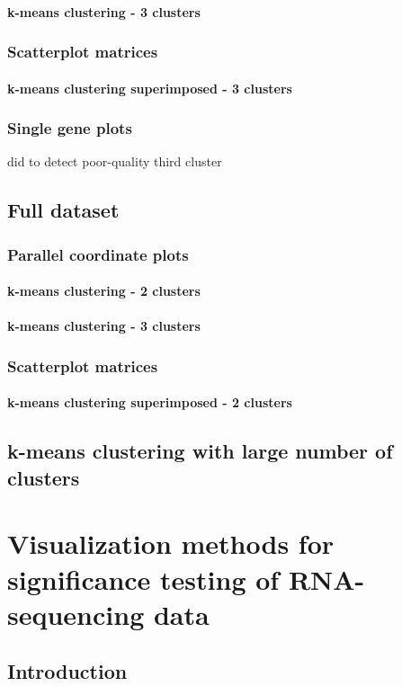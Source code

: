 \documentclass[11pt,a4paper,oldfontcommands,openany]{memoir}
\numberwithin{equation}{section} %
\begin{document}
\subsubsection{k-means clustering - 3 clusters}
\subsection{Scatterplot matrices}
\subsubsection{k-means clustering superimposed - 3 clusters}
\subsection{Single gene plots}
did to detect poor-quality third cluster
\section{Full dataset}
\subsection{Parallel coordinate plots}
\subsubsection{k-means clustering - 2 clusters}
\subsubsection{k-means clustering - 3 clusters}
\subsection{Scatterplot matrices}
\subsubsection{k-means clustering superimposed - 2 clusters}
\section{k-means clustering with large number of clusters}

\chapter{Visualization methods for significance testing of RNA-sequencing data}
\section{Introduction}
\end{document}
